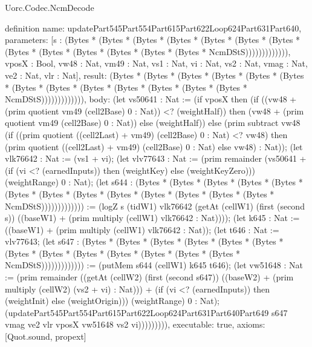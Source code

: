 \begin{lexlean}{Uorc.Codec.NcmDecode}
\begin{semanticmodule}
definition{
  name: updatePart545Part554Part615Part622Loop624Part631Part640,
  parameters: [s : (Bytes * (Bytes * (Bytes * (Bytes * (Bytes * (Bytes * (Bytes * (Bytes * (Bytes * (Bytes * (Bytes * (Bytes * (Bytes * NcmDStS))))))))))))), vposX : Bool, vw48 : Nat, vm49 : Nat, vs1 : Nat, vi : Nat, vs2 : Nat, vmag : Nat, ve2 : Nat, vlr : Nat],
  result: (Bytes * (Bytes * (Bytes * (Bytes * (Bytes * (Bytes * (Bytes * (Bytes * (Bytes * (Bytes * (Bytes * (Bytes * (Bytes * NcmDStS))))))))))))),
  body: (let vs50641 : Nat := (if vposX then (if ((vw48 + (prim quotient vm49 (cell2Base) 0 : Nat)) <? (weightHalf)) then (vw48 + (prim quotient vm49 (cell2Base) 0 : Nat)) else (weightHalf)) else (prim subtract vw48 (if ((prim quotient ((cell2Last) + vm49) (cell2Base) 0 : Nat) <? vw48) then (prim quotient ((cell2Last) + vm49) (cell2Base) 0 : Nat) else vw48) : Nat)); (let vlk76642 : Nat := (vs1 + vi); (let vlv77643 : Nat := (prim remainder (vs50641 + (if (vi <? (earnedInputs)) then (weightKey) else (weightKeyZero))) (weightRange) 0 : Nat); (let s644 : (Bytes * (Bytes * (Bytes * (Bytes * (Bytes * (Bytes * (Bytes * (Bytes * (Bytes * (Bytes * (Bytes * (Bytes * (Bytes * NcmDStS))))))))))))) := (logZ s (tidW1) vlk76642 (getAt (cellW1) (first (second s)) ((baseW1) + (prim multiply (cellW1) vlk76642 : Nat)))); (let k645 : Nat := ((baseW1) + (prim multiply (cellW1) vlk76642 : Nat)); (let t646 : Nat := vlv77643; (let s647 : (Bytes * (Bytes * (Bytes * (Bytes * (Bytes * (Bytes * (Bytes * (Bytes * (Bytes * (Bytes * (Bytes * (Bytes * (Bytes * NcmDStS))))))))))))) := (putMem s644 (cellW1) k645 t646); (let vw51648 : Nat := (prim remainder ((getAt (cellW2) (first (second s647)) ((baseW2) + (prim multiply (cellW2) (vs2 + vi) : Nat))) + (if (vi <? (earnedInputs)) then (weightInit) else (weightOrigin))) (weightRange) 0 : Nat); (updatePart545Part554Part615Part622Loop624Part631Part640Part649 s647 vmag ve2 vlr vposX vw51648 vs2 vi))))))))),
  executable: true,
  axioms: [Quot.sound, propext]
}


\end{semanticmodule}
\end{lexlean}
